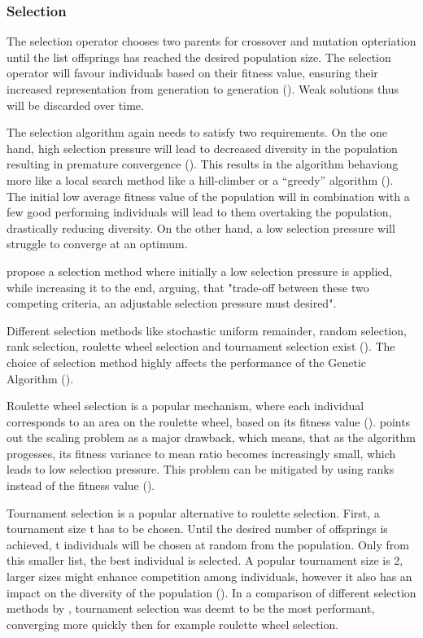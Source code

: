 \subsubsection{Selection}
The selection operator chooses two parents for crossover and mutation opteriation until the list offsprings has reached the desired population size. 
The selection operator will favour individuals based on their fitness value, ensuring their increased representation from generation to generation (\cite{srinivas_genetic_1994}). Weak solutions thus will be discarded over time.

The selection algorithm again needs to satisfy two requirements. On the one hand, high selection pressure will lead to decreased diversity in the population resulting in premature convergence (\cite{katoch_review_2021}). This results in the algorithm behaviong more like a local search method like a hill-climber or a “greedy” algorithm (\cite{kacprzyk_parameter_2007}).
The initial low average fitness value of the population will in combination with a few good performing individuals will lead to them overtaking the population, drastically reducing diversity.
On the other hand, a low selection pressure will struggle to converge at an optimum.

\cite{hussain_trade-off_2020} propose a selection method where initially a low selection pressure is applied, while increasing it to the end, arguing, that "trade-off between these two competing criteria, an adjustable selection pressure must desired".

Different selection methods like stochastic uniform remainder, random selection, rank selection, roulette wheel selection and tournament selection exist (\cite{majumdar_genetic_2015}). The choice of selection method highly affects the performance of the Genetic Algorithm (\cite{hussain_trade-off_2020}).

Roulette wheel selection is a popular mechanism, where each individual corresponds to an area on the roulette wheel, based on its fitness value (). \cite{grefenstette_optimization_1986} points out the scaling problem as a major drawback, which means, that as the algorithm progesses, its fitness variance to mean ratio becomes increasingly small, which leads to low selection pressure.
This problem can be mitigated by using ranks instead of the fitness value (\cite{katoch_review_2021}).

Tournament selection is a popular alternative to roulette selection. First, a tournament size t has to be chosen. Until the desired number of offsprings is achieved, t individuals will be chosen at random from the population. Only from this smaller list, the best individual is selected. A popular tournament size is 2, larger sizes might enhance competition among individuals, however it also has an impact on the diversity of the population (\cite{hussain_trade-off_2020}). In a comparison of different selection methods by \cite{jinghui_zhong_comparison_2005}, tournament selection was deemt to be the most performant, converging more quickly then for example roulette wheel selection.

